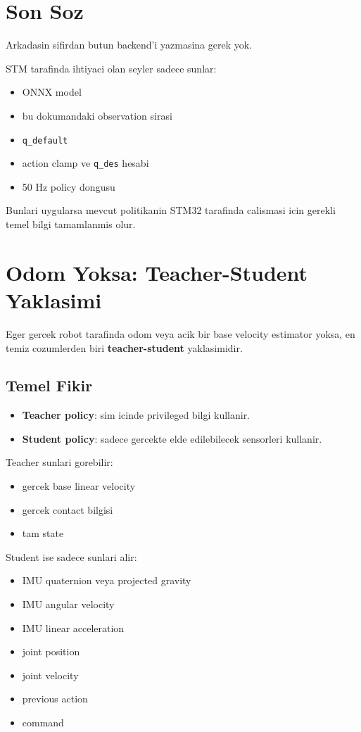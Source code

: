 \documentclass[11pt,a4paper]{article}
\begin{document}
\section{Son Soz}
Arkadasin sifirdan butun backend'i yazmasina gerek yok.

STM tarafinda ihtiyaci olan seyler sadece sunlar:
\begin{itemize}
  \item ONNX model
  \item bu dokumandaki observation sirasi
  \item \texttt{q\_default}
  \item action clamp ve \texttt{q\_des} hesabi
  \item 50 Hz policy dongusu
\end{itemize}

\noindent
Bunlari uygularsa mevcut politikanin STM32 tarafinda calismasi icin gerekli temel bilgi tamamlanmis olur.

\section{Odom Yoksa: Teacher-Student Yaklasimi}
Eger gercek robot tarafinda odom veya acik bir base velocity estimator yoksa, en temiz cozumlerden biri \textbf{teacher-student} yaklasimidir.

\subsection*{Temel Fikir}
\begin{itemize}
  \item \textbf{Teacher policy}: sim icinde privileged bilgi kullanir.
  \item \textbf{Student policy}: sadece gercekte elde edilebilecek sensorleri kullanir.
\end{itemize}

\noindent
Teacher sunlari gorebilir:
\begin{itemize}
  \item gercek base linear velocity
  \item gercek contact bilgisi
  \item tam state
\end{itemize}

\noindent
Student ise sadece sunlari alir:
\begin{itemize}
  \item IMU quaternion veya projected gravity
  \item IMU angular velocity
  \item IMU linear acceleration
  \item joint position
  \item joint velocity
  \item previous action
  \item command
\end{itemize}
\end{document}
